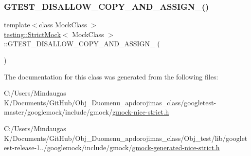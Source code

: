\mbox{\label{classtesting_1_1_strict_mock_af8425a436acea9e665a223971bac8a71}} 
\subsubsection{\texorpdfstring{GTEST\_DISALLOW\_COPY\_AND\_ASSIGN\_()}{GTEST\_DISALLOW\_COPY\_AND\_ASSIGN\_()}\hspace{0.1cm}{\footnotesize\ttfamily [3/3]}}
{\footnotesize\ttfamily template$<$class Mock\+Class $>$ \\
\mbox{\hyperlink{classtesting_1_1_strict_mock}{testing\+::\+Strict\+Mock}}$<$ Mock\+Class $>$\+::G\+T\+E\+S\+T\+\_\+\+D\+I\+S\+A\+L\+L\+O\+W\+\_\+\+C\+O\+P\+Y\+\_\+\+A\+N\+D\+\_\+\+A\+S\+S\+I\+G\+N\+\_\+ (\begin{DoxyParamCaption}\item[{\mbox{\hyperlink{classtesting_1_1_strict_mock}{Strict\+Mock}}$<$ Mock\+Class $>$}]{ }\end{DoxyParamCaption})\hspace{0.3cm}{\ttfamily [private]}}



The documentation for this class was generated from the following files\+:\begin{DoxyCompactItemize}
\item 
C\+:/\+Users/\+Mindaugas K/\+Documents/\+Git\+Hub/\+Obj\+\_\+\+Duomenu\+\_\+apdorojimas\+\_\+class/googletest-\/master/googlemock/include/gmock/\mbox{\hyperlink{googletest-master_2googlemock_2include_2gmock_2gmock-nice-strict_8h}{gmock-\/nice-\/strict.\+h}}\item 
C\+:/\+Users/\+Mindaugas K/\+Documents/\+Git\+Hub/\+Obj\+\_\+\+Duomenu\+\_\+apdorojimas\+\_\+class/\+Obj\+\_\+test/lib/googletest-\/release-\/1../googlemock/include/gmock/\mbox{\hyperlink{gmock-generated-nice-strict_8h}{gmock-\/generated-\/nice-\/strict.\+h}}\end{DoxyCompactItemize}
